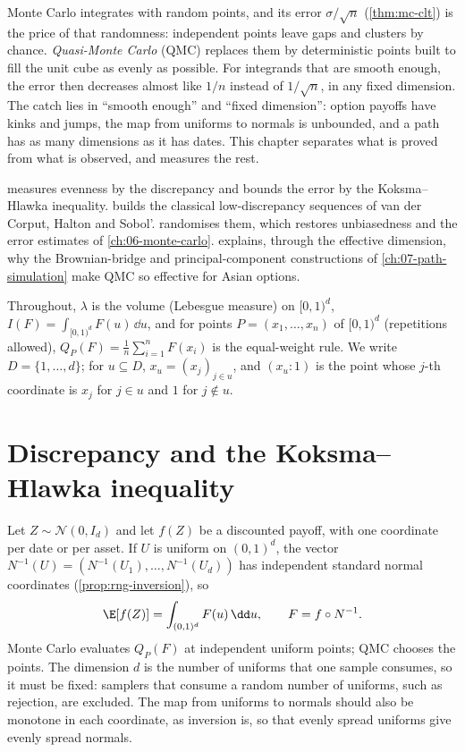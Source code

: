 \providecommand{\Corr}{\operatorname{Corr}}

Monte Carlo integrates with random points, and its error $\sigma/\sqrt n$ (\cref{thm:mc-clt})
is the price of that randomness: independent points leave gaps and clusters by chance.
\emph{Quasi-Monte Carlo} (QMC) replaces them by deterministic points built to fill the unit
cube as evenly as possible. For integrands that are smooth enough, the error then decreases
almost like $1/n$ instead of $1/\sqrt n$, in any fixed dimension. The catch lies in ``smooth
enough'' and ``fixed dimension'': option payoffs have kinks and jumps, the map from
uniforms to normals is unbounded, and a path has as many dimensions as it has dates. This
chapter separates what is proved from what is observed, and measures the rest.

 measures evenness by the discrepancy and bounds the error by the
Koksma--Hlawka inequality.  builds the classical low-discrepancy
sequences of van der Corput, Halton and Sobol'.  randomises them, which
restores unbiasedness and the error estimates of \cref{ch:06-monte-carlo}.
 explains, through the effective dimension, why the Brownian-bridge
and principal-component constructions of \cref{ch:07-path-simulation} make QMC so effective
for Asian options.

Throughout, $\lambda$ is the volume (Lebesgue measure) on $[0,1)^d$,
$I(F)=\int_{[0,1)^d}F(u)\,\dd u$, and for points $P=(x_1,\dots,x_n)$ of $[0,1)^d$
(repetitions allowed), $Q_P(F)=\frac1n\sum_{i=1}^nF(x_i)$ is the equal-weight rule. We write
$D=\{1,\dots,d\}$; for $u\subseteq D$, $x_u=(x_j)_{j\in u}$, and $(x_u{:}1)$ is the point whose
$j$-th coordinate is $x_j$ for $j\in u$ and $1$ for $j\notin u$.

\section{Discrepancy and the Koksma--Hlawka inequality}\label{sec:qmc-discrepancy}

Let $Z\sim\mathcal N(0,I_d)$ and let $f(Z)$ be a discounted payoff, with one coordinate per
date or per asset. If $U$ is uniform on $(0,1)^d$, the vector
$N^{-1}(U)=(N^{-1}(U_1),\dots,N^{-1}(U_d))$ has independent standard normal coordinates
(\cref{prop:rng-inversion}), so
\begin{equation}\label{eq:qmc-cube}
  \E[f(Z)]=\int_{(0,1)^d}F(u)\,\dd u,\qquad F=f\circ N^{-1}.
\end{equation}
Monte Carlo evaluates $Q_P(F)$ at independent uniform points; QMC chooses the points. The
dimension $d$ is the number of uniforms that one sample consumes, so it must be fixed:
samplers that consume a random number of uniforms, such as rejection, are excluded. The map
from uniforms to normals should also be monotone in each coordinate, as inversion is, so that
evenly spread uniforms give evenly spread normals.


